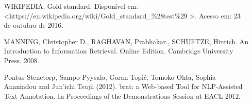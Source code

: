 \documentclass[11pt]{report}
\begin{document}
\begin{enumerate}[label={[\arabic*]}]
\item WIKIPEDIA. Gold-standard. Disponível em: \newline\textless\enspace https://en.wikipedia.org/wiki/Gold\_standard\_\%28test\%29 \enspace\textgreater. Acesso em: 23 de outubro de 2016.
\item MANNING, Christopher D., RAGHAVAN, Prabhakar., SCHUETZE, Hinrich. An Introduction to Information Retrieval. Online Edition. Cambridge University Press. 2008.
\item Pontus Stenetorp, Sampo Pyysalo, Goran Topić, Tomoko Ohta, Sophia Ananiadou and Jun'ichi Tsujii (2012). brat: a Web-based Tool for NLP-Assisted Text Annotation. In Proceedings of the Demonstrations Session at EACL 2012.
\end{enumerate}
\end{document}
